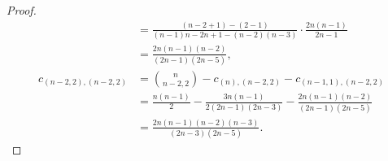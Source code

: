 \documentclass[10pt,oneside,american]{amsart}
\numberwithin{equation}{section}
\numberwithin{figure}{section}
\theoremstyle{definition}
\theoremstyle{remark}
\theoremstyle{plain}
\theoremstyle{definition}
\theoremstyle{plain}
\theoremstyle{plain}
\theoremstyle{plain}
\begin{document}
\begin{proof}
\begin{align*}
  &= \frac{\left(n-2+1\right)-\left(2-1\right)}{\left(n-1\right)n-2n+1-\left(n-2\right)\left(n-3\right)}\cdot\frac{2n\left(n-1\right)}{2n-1}\\
  &= \frac{2n\left(n-1\right)\left(n-2\right)}{\left(2n-1\right)\left(2n-5\right)},\\
  c_{\left(n-2,2\right),\left(n-2,2\right)}
  &= \binom{n}{n-2,2}-c_{\left(n\right),\left(n-2,2\right)}-c_{\left(n-1,1\right),\left(n-2,2\right)}\\
  &= \frac{n\left(n-1\right)}{2}-\frac{3n\left(n-1\right)}{2\left(2n-1\right)\left(2n-3\right)}-\frac{2n\left(n-1\right)\left(n-2\right)}{\left(2n-1\right)\left(2n-5\right)}\\
  &= \frac{2n\left(n-1\right)\left(n-2\right)\left(n-3\right)}{\left(2n-3\right)\left(2n-5\right)}.
\end{align*}
\end{proof}

\end{document}

